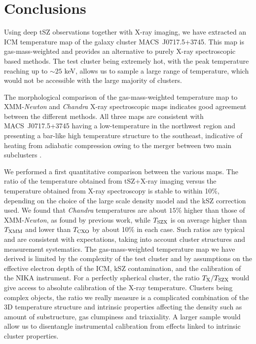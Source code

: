 \documentclass[twocolumn,traditabstract]{aa}
\newcommand{\ccor}[1]{\textcolor{Mypink}{#1}}
\def\TSZ {T_{\rm SZX}}
\def \TXC {T_{\rm CXO}}
\def \TXX {T_{\rm XMM}}
\begin{document}
\section{Conclusions}\label{sec:conclusions}
Using deep tSZ observations together with X-ray imaging, we have extracted an ICM temperature map of the galaxy cluster \mbox{MACS~J0717.5+3745}. This map is gas-mass-weighted and provides an alternative to purely X-ray spectroscopic based methods. The test cluster being extremely hot, with the peak temperature reaching up to $\sim 25$ keV, allows us to sample a large range of temperature, which would not be accessible with the large majority of clusters.

The morphological comparison of the gas-mass-weighted temperature map to XMM-\textit{Newton} and \textit{Chandra} X-ray spectroscopic maps indicates good agreement between the different methods. All three maps are consistent with \mbox{MACS~J0717.5+3745} having a low-temperature in the northwest region and presenting a bar-like high temperature structure to the southeast, indicative of heating from adiabatic compression owing to the merger between two main subclusters \citep[see, e.g.,][]{Ma2009}.

\ccor{We performed a first quantitative comparison between the various maps. The ratio of the temperature obtained from tSZ+X-ray imaging versus the temperature obtained from X-ray spectroscopy is stable to within 10\%, depending on the choice of the large scale density model and the kSZ correction used. We found that \textit{Chandra} temperatures are about $15\%$ higher than those of XMM-\textit{Newton}, as found by previous work, while $\TSZ$ is on average higher than $\TXX$ and lower than $\TXC$ by about 10\% in each case. Such ratios are typical and are consistent with expectations, taking into account cluster structures and measurement systematics.} The gas-mass-weighted temperature map we have derived is limited by the complexity of the test cluster and by assumptions on the effective electron depth of the ICM, kSZ contamination, and the calibration of the NIKA instrument. For a perfectly spherical cluster, the ratio $T_{\rm X} / \TSZ$ would give access to absolute calibration of the X-ray temperature. Clusters being complex objects, the ratio we really measure is a complicated combination of the 3D temperature structure and intrinsic properties affecting the density such as amount of substructure, gas clumpiness and triaxiality. A larger sample would allow us to disentangle instrumental calibration from effects linked to intrinsic cluster properties.
\end{document}
